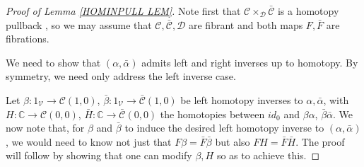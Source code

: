 \documentclass[a4paper,10pt
,draft
]{article}%
\numberwithin{equation}{section}
\numberwithin{figure}{section}
\theoremstyle{definition} %
\newcommand{\V}{\ensuremath{\mathcal V}}
\newcommand{\1}{\ensuremath{\mathbbm 1}}%
\begin{document}
\begin{proof}[Proof of Lemma \ref{HOMINPULL LEM}]
	Note first that
	$\mathcal{C} \times_{\mathcal{D}}\bar{\mathcal{C}}$
	is a homotopy pullback
	\cite[Prop. A.2.4.4]{Lur09},
	so we may assume that
	$\mathcal{C},\bar{\mathcal{C}},\mathcal{D}$
	are fibrant and both maps $F,\bar{F}$ are fibrations.
	
	We need to show that $(\alpha,\bar{\alpha})$
	admits left and right inverses up to homotopy.
	By symmetry, we need only address the left inverse case.
	
	Let
	$\beta \colon 1_{\V} \to \mathcal{C}(1,0)$,
	$\bar{\beta} \colon 1_{\V} \to \bar{\mathcal{C}}(1,0)$
	be left homotopy inverses to $\alpha,\bar{\alpha}$,
	with 
	$H \colon \mathbb{C} \to \mathcal{C}(0,0)$,
	$\bar{H} \colon \mathbb{C} \to \bar{\mathcal{C}}(0,0)$
	the homotopies between 
	$id_0$ and $\beta\alpha$, $\bar{\beta}\bar{\alpha}$.
	We now note that, for $\beta$ and $\bar{\beta}$ to induce the desired 
	left homotopy inverse to 
	$(\alpha,\bar{\alpha})$,
	we would need to know not just that 
	$F\beta=\bar{F}\bar{\beta}$
	but also 
	$FH=\bar{F}\bar{H}$.
	The proof will follow by showing that one can modify 
	$\beta,H$ so as to achieve this.
	

\end{proof}
\end{document}
